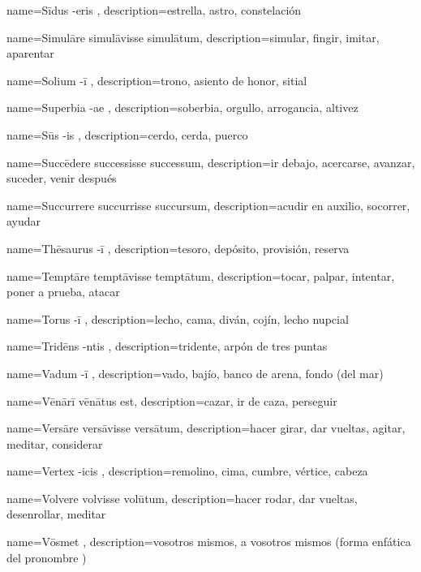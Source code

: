 {name={Sīdus -eris },
description={estrella, astro, constelación}}

{name={Simulāre simulāvisse simulātum},
description={simular, fingir, imitar, aparentar}}

{name={Solium -ī },
description={trono, asiento de honor, sitial}}

{name={Superbia -ae },
description={soberbia, orgullo, arrogancia, altivez}}

{name={Sūs -is },
description={cerdo, cerda, puerco}}

{name={Succēdere successisse successum},
description={ir debajo, acercarse, avanzar, suceder, venir después}}

{name={Succurrere succurrisse succursum},
description={acudir en auxilio, socorrer, ayudar}}

{name={Thēsaurus -ī },
description={tesoro, depósito, provisión, reserva}}

{name={Temptāre temptāvisse temptātum},
description={tocar, palpar, intentar, poner a prueba, atacar}}

{name={Torus -ī },
description={lecho, cama, diván, cojín, lecho nupcial}}

{name={Tridēns -ntis },
description={tridente, arpón de tres puntas}}

{name={Vadum -ī },
description={vado, bajío, banco de arena, fondo (del mar)}}

{name={Vēnārī vēnātus est},
description={cazar, ir de caza, perseguir}}

{name={Versāre versāvisse versātum},
description={hacer girar, dar vueltas, agitar, meditar, considerar}}

{name={Vertex -icis },
description={remolino, cima, cumbre, vértice, cabeza}}

{name={Volvere volvisse volūtum},
description={hacer rodar, dar vueltas, desenrollar, meditar}}

{name={Vōsmet },
description={vosotros mismos, a vosotros mismos (forma enfática del pronombre )}}


